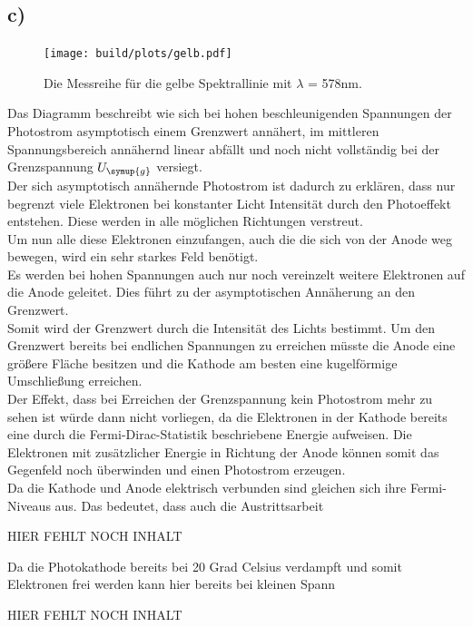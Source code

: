     \subsection{c)}

    \begin{figure}[H]
        \centering
        \texttt{[image: build/plots/gelb.pdf]}
        \caption{Die Messreihe für die gelbe Spektrallinie mit $\lambda$ = 578nm.}
        \label{img:gelb}
    \end{figure}

    \noindent
    Das Diagramm beschreibt wie sich bei hohen beschleunigenden Spannungen der Photostrom asymptotisch einem Grenzwert annähert, im mittleren 
    Spannungsbereich annähernd linear abfällt und noch nicht vollständig bei der Grenzspannung $U_{\symup{g}}$ versiegt.\\
    Der sich asymptotisch annähernde Photostrom ist dadurch zu erklären, dass nur begrenzt viele Elektronen bei konstanter Licht Intensität 
    durch den Photoeffekt entstehen. Diese werden in alle möglichen Richtungen verstreut.\\
    Um nun alle diese Elektronen einzufangen, auch die die sich  
    von der Anode weg bewegen, wird ein sehr starkes Feld benötigt.\\
    Es werden bei hohen Spannungen auch nur noch vereinzelt
    weitere Elektronen auf die Anode geleitet. Dies führt zu der asymptotischen Annäherung an den Grenzwert.\\
    Somit wird der Grenzwert durch die 
    Intensität des Lichts bestimmt. Um den Grenzwert bereits bei endlichen Spannungen zu erreichen müsste die Anode eine größere Fläche besitzen
    und die Kathode am besten eine kugelförmige Umschließung erreichen.\\
    Der Effekt, dass bei Erreichen der Grenzspannung kein Photostrom mehr zu sehen ist würde dann nicht vorliegen, da die Elektronen in der Kathode 
    bereits eine durch die Fermi-Dirac-Statistik beschriebene Energie aufweisen. Die Elektronen mit zusätzlicher Energie in Richtung der Anode 
    können somit das Gegenfeld noch überwinden und einen Photostrom erzeugen.\\
    Da die Kathode und Anode elektrisch verbunden sind gleichen sich ihre Fermi-Niveaus aus. 
    Das bedeutet, dass auch die Austrittsarbeit 
    
    HIER FEHLT NOCH INHALT
    
    Da die Photokathode bereits bei 20 Grad Celsius verdampft und somit Elektronen frei werden kann hier bereits bei kleinen Spann

    HIER FEHLT NOCH INHALT

